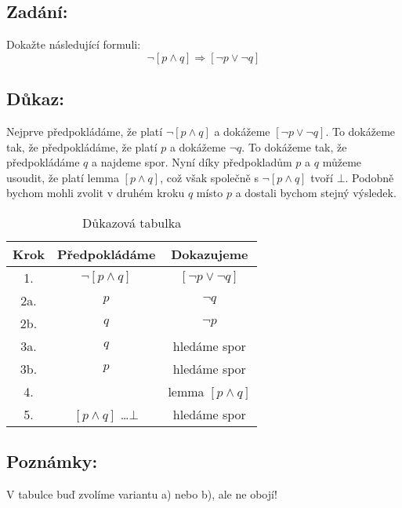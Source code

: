 \documentclass{article}
\begin{document}
\subsection{Zadání:}

Dokažte následující formuli:
$$\neg [p \wedge q] \Rightarrow [\neg p \lor \neg q]$$

\subsection{Důkaz:}

Nejprve předpokládáme, že platí $\neg [p \wedge q]$ a dokážeme $[\neg p \lor \neg q]$. To dokážeme tak, že předpokládáme, že platí $p$ a dokážeme $\neg q$. To dokážeme tak, že předpokládáme $q$ a najdeme spor. Nyní díky předpokladům $p$ a $q$ můžeme usoudit, že platí lemma $[p \wedge q]$, což však společně s $\neg [p \wedge q]$ tvoří $\bot$. Podobně bychom mohli zvolit v druhém kroku $q$ místo $p$ a dostali bychom stejný výsledek.

\begin{table}[H]\centering

    \caption{Důkazová tabulka}

\begin{tabular}{|c|c|c|}
    
    
        \hline \textbf{Krok} & \textbf{Předpokládáme} & \textbf{Dokazujeme} \\ \hline \hline
    	1. & $\neg [p \wedge q]$ & $[\neg p \lor \neg q]$  \\ \hline
    	2a. & $p$ & $\neg q$  \\ \hline
    	2b. & $q$ & $\neg p$  \\ \hline
    	3a. & $q$ & hledáme spor  \\ \hline
    	3b. & $p$ & hledáme spor  \\ \hline
    	4. &  & lemma $[p \wedge q]$  \\ \hline
    	5. & $[p \wedge q]$ \dots $\bot$ & hledáme spor  \\ \hline
            
    	\end{tabular}
\end{table}

\subsection{Poznámky:}
V tabulce buď zvolíme variantu a) nebo b), ale ne obojí!
\end{document}
